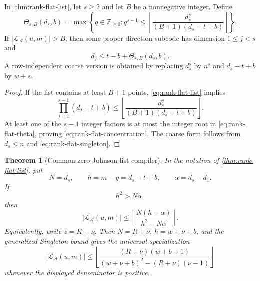 \documentclass[11pt,a4paper]{amsart}
\numberwithin{equation}{section}
\newtheorem{theorem}{Theorem}[section]
\theoremstyle{remark}
\begin{document}
\begin{corollary}
\label{cor:rank-flat-concentration}
In \cref{thm:rank-flat-list}, let \(s\ge2\) and let \(B\) be a nonnegative
integer.  Define
\begin{equation}
 \Theta_{s,B}(d_s,b)=
 \max\left\{q\in\mathbb Z_{\ge0}:
 q^{s-1}\le
 \left\lfloor
 \frac{d_s^{\underline s}}
 {(B+1)(d_s-t+b)}
 \right\rfloor
 \right\}.
 \label{eq:rank-flat-theta}
\end{equation}
If \(|\mathcal L_{\mathcal A}(u,m)|>B\), then some proper direction
subcode has dimension \(1\le j<s\) and
\begin{equation}
                     d_j\le t-b+\Theta_{s,B}(d_s,b).
 \label{eq:rank-flat-concentration}
\end{equation}
A row-independent coarse version is obtained by replacing
\(d_s^{\underline s}\) by \(n^{\underline s}\) and
\(d_s-t+b\) by \(w+s\).
\end{corollary}

\begin{proof}
If the list contains at least \(B+1\) points, \eqref{eq:rank-flat-list}
implies
\[
 \prod_{j=1}^{s-1}(d_j-t+b)
 \le
 \left\lfloor
 \frac{d_s^{\underline s}}
 {(B+1)(d_s-t+b)}
 \right\rfloor .
\]
At least one of the \(s-1\) integer factors is at most the integer root in
\eqref{eq:rank-flat-theta}, proving \eqref{eq:rank-flat-concentration}.
The coarse form follows from \(d_s\le n\) and
\eqref{eq:rank-flat-singleton}.
\end{proof}

\begin{theorem}[Common-zero Johnson list compiler]
\label{thm:common-zero-johnson}
In the notation of \cref{thm:rank-flat-list}, put
\[
 N=d_s,
 \qquad h=m-g=d_s-t+b,
 \qquad \alpha=d_s-d_1.
\]
If
\begin{equation}
                         h^2>N\alpha,
 \label{eq:common-zero-johnson-condition}
\end{equation}
then
\begin{equation}
 |\mathcal L_{\mathcal A}(u,m)|
 \le
 \left\lfloor
 \frac{N(h-\alpha)}{h^2-N\alpha}
 \right\rfloor .
 \label{eq:common-zero-johnson}
\end{equation}
Equivalently, write \(z=K-\nu\).  Then \(N=R+\nu\),
\(h=w+\nu+b\), and the generalized Singleton bound gives the universal
specialization
\begin{equation}
 |\mathcal L_{\mathcal A}(u,m)|
 \le
 \left\lfloor
 \frac{(R+\nu)(w+b+1)}
 {(w+\nu+b)^2-(R+\nu)(\nu-1)}
 \right\rfloor
 \label{eq:common-zero-nu}
\end{equation}
whenever the displayed denominator is positive.
\end{theorem}
\end{document}
